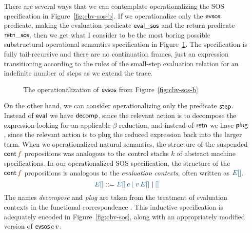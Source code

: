 There are several ways that we can contemplate operationalizing the
SOS specification in Figure~\ref{fig:cbv-sos-b}. If we operationalize
only the ${\sf evsos}$ predicate, making the evaluation predicate
${\sf eval\_sos}$ and the return predicate ${\sf retn\_sos}$, then we
get what I consider to be the most boring possible substructural
operational semantics specification in
Figure~\ref{fig:sos-tailrecursion}. The specification is fully 
tail-recursive and there are no continuation frames, just an expression
transitioning according to the rules of the small-step evaluation 
relation for an indefinite number of steps as we extend the trace. 

\begin{figure}[tp]
\begin{minipage}[b]{0.9\linewidth}
\end{minipage}
\caption{The operationalization of ${\sf evsos}$ from
  Figure~\ref{fig:cbv-sos-b}}
\label{fig:sos-tailrecursion}
\end{figure}



On the other hand, we can consider operationalizing only the 
predicate ${\sf step}$. Instead of ${\sf eval}$ we have 
${\sf decomp}$, since the relevant action is to decompose the
expression looking for an applicable $\beta$-reduction, and instead of 
${\sf retn}$ we have ${\sf plug}$, since the relevant action is 
to plug the reduced expression back into the larger term.
When we operationalized natural semantics, the structure of the
suspended ${\sf cont}\,\lf{f}$ propositions was analogous to the control
stacks $k$ of abstract machine specifications. In our operationalized
SOS specification, the structure of the ${\sf cont}\,\lf{f}$ propositions
is analogous to the {\it evaluation contexts}, often written as 
$\obj{E[]}$.
\[
\obj{E[]} ::= \obj{E[]\,e} \mid \obj{v\,E[]} \mid \obj{[]}
\]
The names {\it decompose} and {\it plug} are taken from the treatment
of evaluation contexts in the functional correspondence
\cite{danvy08defunctionalized}.
This inductive specification is adequately encoded in 
Figure~\ref{fig:cbv-sos}, along with an appropriately modified
version of ${\sf evsos}\,e\,v$. 


